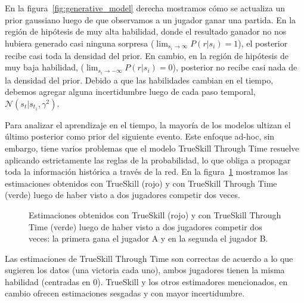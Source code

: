 \documentclass[a4paper,11pt]{book}
\newcommand{\N}{\mathcal{N}}
\theoremstyle{definition}
\begin{document}
%
%
En la figura~\ref{fig:generative_model} derecha mostramos cómo se actualiza un prior gaussiano luego de que observamos a un jugador ganar una partida.
%
En la región de hipótesis de muy alta habilidad, donde el resultado ganador no nos hubiera generado casi ninguna sorpresa ($\lim_{s_i \to \infty}P(r|s_i) = 1$), el posterior recibe casi toda la densidad del prior.
%
En cambio, en la región de hipótesis de muy baja habilidad, ($\lim_{s_i \to -\infty}P(r|s_i) = 0$), posterior no recibe casi nada de la densidad del prior.
%
Debido a que las habilidades cambian en el tiempo, debemos agregar alguna incertidumbre luego de cada paso temporal, $\N(s_t | s_{t_1}, \gamma^2)$.

Para analizar el aprendizaje en el tiempo, la mayoría de los modelos ultizan el último posterior como prior del siguiente evento.
%
Este enfoque ad-hoc, sin embargo, tiene varios problemas que el modelo TrueSkill Through Time resuelve aplicando estrictamente las reglas de la probabilidad, lo que obliga a propagar toda la información histórica a través de la red.
%
En la figura~\ref{fig:trueskillthroughtime} mostramos las estimaciones obtenidos con TrueSkill (rojo) y con TrueSkill Through Time (verde) luego de haber visto a dos jugadores competir dos veces.
%
\begin{figure}[ht!]
\centering
{}
\caption{
 Estimaciones obtenidos con TrueSkill (rojo) y con TrueSkill Through Time (verde) luego de haber visto a dos jugadores competir dos veces: la primera gana el jugador A y en la segunda el jugador B.
}
\label{fig:trueskillthroughtime}
\end{figure}
%
Las estimaciones de TrueSkill Through Time son correctas de acuerdo a lo que sugieren los datos (una victoria cada uno), ambos jugadores tienen la misma habilidad (centradas en 0).
%
TrueSkill y los otros estimadores mencionados, en cambio ofrecen estimaciones sesgadas y con mayor incertidumbre.
\end{document}
